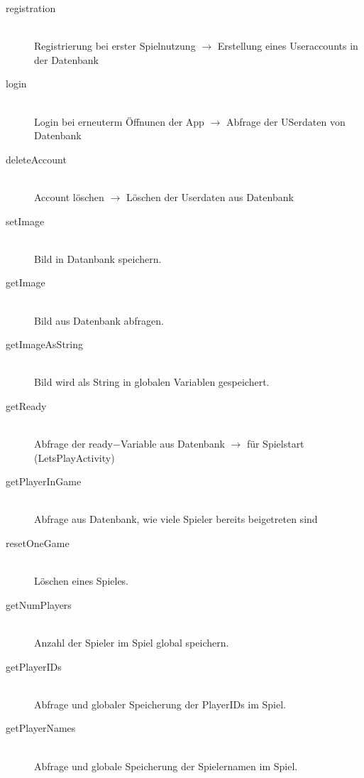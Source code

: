 \documentclass[12pt, a4paper]{article}
\begin{document}
\begin{description}

\item[registration]\hfill \\
Registrierung bei erster Spielnutzung $\rightarrow$ Erstellung eines Useraccounts in der Datenbank

\item[login]\hfill \\
Login bei erneuterm Öffnunen der App $\rightarrow$ Abfrage der USerdaten von Datenbank

\item[deleteAccount]\hfill \\
Account löschen $\rightarrow$ Löschen der Userdaten aus Datenbank

\item[setImage]\hfill \\
Bild in Datanbank speichern.

\item[getImage]\hfill \\
Bild aus Datenbank abfragen.

\item[getImageAsString]\hfill \\
Bild wird als String in globalen Variablen gespeichert.

\item[getReady]\hfill \\
Abfrage der ready$-$Variable aus Datenbank $\rightarrow$ für Spielstart (LetsPlayActivity)

\item[getPlayerInGame]\hfill \\
Abfrage aus Datenbank, wie viele Spieler bereits beigetreten sind 

\item[resetOneGame]\hfill \\
Löschen eines Spieles.

\item[getNumPlayers]\hfill \\
Anzahl der Spieler im Spiel global speichern.

\item[getPlayerIDs]\hfill \\
Abfrage und globaler Speicherung der PlayerIDs im Spiel.

\item[getPlayerNames]\hfill \\
Abfrage und globale Speicherung der Spielernamen im Spiel.


\end{description}
\end{document}
